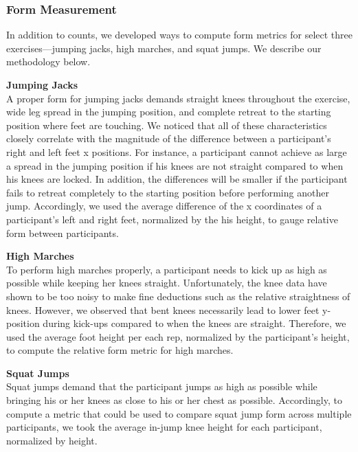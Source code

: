 \subsubsection{Form Measurement}

In addition to counts, we developed ways to compute form metrics for select three exercises---jumping jacks, high marches, and squat jumps. We describe our methodology below.

\textbf{Jumping Jacks} \\
A proper form for jumping jacks demands straight knees throughout the exercise, wide leg spread in the jumping position, and complete retreat to the starting position where feet are touching. We noticed that all of these characteristics closely correlate with the magnitude of the difference between a participant's right and left feet x positions. For instance, a participant cannot achieve as large a spread in the jumping position if his knees are not straight compared to when his knees are locked. In addition, the differences will be smaller if the participant fails to retreat completely to the starting position before performing another jump. Accordingly, we used the average difference of the x coordinates of a participant's left and right feet, normalized by the his height, to gauge relative form between participants.

\textbf{High Marches} \\
To perform high marches properly, a participant needs to kick up as high as possible while keeping her knees straight. Unfortunately, the knee data have shown to be too noisy to make fine deductions such as the relative straightness of knees. However, we observed that bent knees necessarily lead to lower feet y-position during kick-ups compared to when the knees are straight. Therefore, we used the average foot height per each rep, normalized by the participant's height, to compute the relative form metric for high marches.

\textbf{Squat Jumps} \\
Squat jumps demand that the participant jumps as high as possible while bringing his or her knees as close to his or her chest as possible. Accordingly, to compute a metric that could be used to compare squat jump form across multiple participants, we took the average in-jump knee height for each participant, normalized by height.

